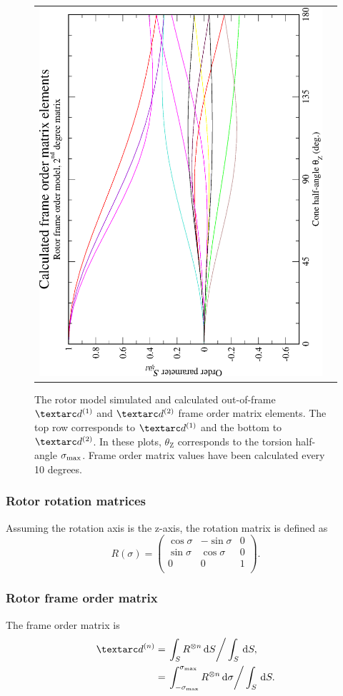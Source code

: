 \begin{figure}
\begin{tabular}{@{}cc@{}}
    \includegraphics[width=.35\textwidth,angle=270]{images/frame_order_matrix/Sijkl_rotor_out_of_frame_theta_z_calc.eps} \\
  \end{tabular}
  \caption[Rotor simulated and calculated out-of-frame $\FOone$ and $\FOtwo$ elements.]{
    The rotor model simulated and calculated out-of-frame $\FOone$ and $\FOtwo$ frame order matrix elements.
    The top row corresponds to $\FOone$ and the bottom to $\FOtwo$.
    In these plots, $\theta_\textrm{Z}$ corresponds to the torsion half-angle $\sigma_\textrm{max}$.
    Frame order matrix values have been calculated every 10 degrees.
  }
  \label{fig: simulated and calculated out-of-frame 1st and 2nd degree rotor frame order}
\end{figure}


\subsubsection{Rotor rotation matrices}

Assuming the rotation axis is the z-axis, the rotation matrix is defined as
\begin{equation}\label{eq: R matrix torsion}
    R(\sigma) =
        \begin{pmatrix}
            \cos\sigma & -\sin\sigma & 0 \\
            \sin\sigma & \cos\sigma  & 0 \\
            0          & 0           & 1 \\
        \end{pmatrix}.
\end{equation}

\subsubsection{Rotor frame order matrix}

The frame order matrix is
\begin{subequations}
\begin{align}
    \FOn &= \left. \int_S R^{\otimes n} \diff S \right / \int_S \diff S, \\
         &= \left. \int_{-\conesmax}^{\conesmax} R^{\otimes n} \diff \sigma  \right / \int_S \diff S.
\end{align}
\end{subequations}

